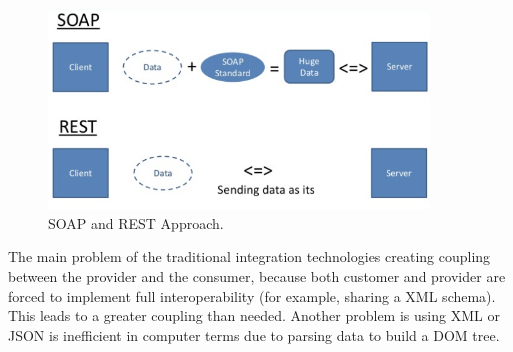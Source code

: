 \begin{figure}[!htb]
  \centering
  \includegraphics[width=0.9\textwidth]{Figures/soap-rest.png}
  \caption[SOAP and REST Approach.]{SOAP and REST Approach.}
  \label{fig:soaprest}
\end{figure}

The main problem of the traditional integration technologies creating coupling between the provider and the consumer, because both customer and provider are forced to implement full interoperability (for example, sharing a XML schema). This leads to a greater coupling than needed. Another problem is using XML or JSON is inefficient in computer terms due to parsing data to build a DOM tree.

